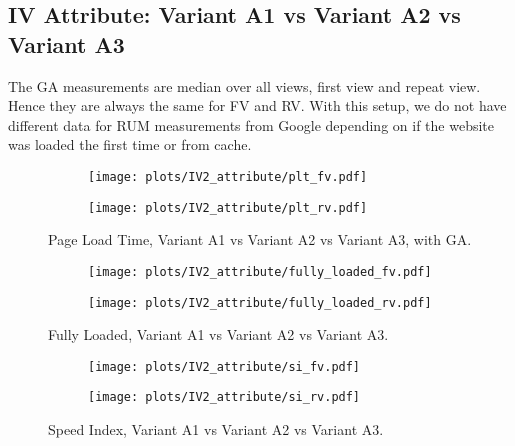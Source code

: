 

\subsection{IV Attribute: Variant A1 vs Variant A2 vs Variant A3}


The GA measurements are median over all views, first view and repeat view.
Hence they are always the same for FV and RV.
With this setup, we do not have different data for RUM measurements from Google depending on if the website was loaded the first time or from cache.




\begin{figure}
	\centering
	\begin{subfigure}{.5\textwidth}
		\centering
		\texttt{[image: plots/IV2\_attribute/plt\_fv.pdf]}
		\label{fig:sub1}
	\end{subfigure}%
	\begin{subfigure}{.5\textwidth}
		\centering
		\texttt{[image: plots/IV2\_attribute/plt\_rv.pdf]}
		\label{fig:sub2}
	\end{subfigure}
	\caption{Page Load Time, Variant A1 vs Variant A2 vs Variant A3, with GA.}
	\label{figure:plt_original_test}
\end{figure}


\begin{figure}
	\centering
	\begin{subfigure}{.5\textwidth}
		\centering
		\texttt{[image: plots/IV2\_attribute/fully\_loaded\_fv.pdf]}
		\label{fig:sub1}
	\end{subfigure}%
	\begin{subfigure}{.5\textwidth}
		\centering
		\texttt{[image: plots/IV2\_attribute/fully\_loaded\_rv.pdf]}
		\label{fig:sub2}
	\end{subfigure}
	\caption{Fully Loaded, Variant A1 vs Variant A2 vs Variant A3.}
	\label{figure:plt_original_test}
\end{figure}

\clearpage

\begin{figure}
	\centering
	\begin{subfigure}{.5\textwidth}
		\centering
		\texttt{[image: plots/IV2\_attribute/si\_fv.pdf]}
		\label{fig:sub1}
	\end{subfigure}%
	\begin{subfigure}{.5\textwidth}
		\centering
		\texttt{[image: plots/IV2\_attribute/si\_rv.pdf]}
		\label{fig:sub2}
	\end{subfigure}
	\caption{Speed Index, Variant A1 vs Variant A2 vs Variant A3.}
	\label{figure:plt_original_test}
\end{figure}


